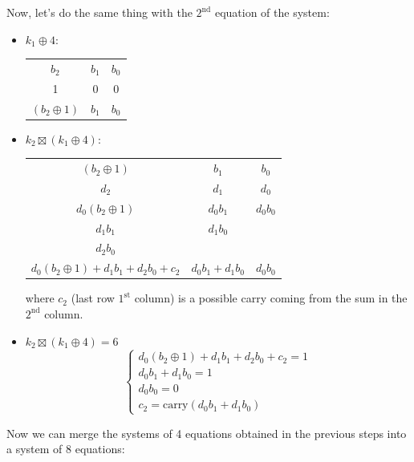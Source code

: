 \documentclass[11pt, a4paper]{article}
\begin{document}
\newpage
\hfill\break
Now, let's do the same thing with the $2^{\text{nd}}$ equation of the system:
\begin{itemize}
    \item $k_1\oplus4$:
    \begin{center}
        \begin{tabular}{ccc}
            $b_2$&$b_1$&$b_0$\\
            1&0&0\\
            \hline
            $(b_2\oplus1)$&$b_1$&$b_0$
        \end{tabular}
    \end{center}
    \item $k_2\boxtimes(k_1\oplus4)$:
    \begin{center}
        \begin{tabular}{c|c|c}
            $(b_2\oplus1)$&$b_1$&$b_0$\\
            $d_2$&$d_1$&$d_0$\\
            \hline
            $d_0(b_2\oplus1)$&$d_0b_1$&$d_0b_0$\\
            $d_1b_1$&$d_1b_0$&\\
            $d_2b_0$&&\\
            \hline
            $d_0(b_2\oplus1)+d_1b_1+d_2b_0+c_2$&$d_0b_1+d_1b_0$&$d_0b_0$
        \end{tabular}
    \end{center}
    where $c_2$ (last row $1^{\text{st}}$ column) is a possible carry coming from the sum in the $2^{\text{nd}}$ column.
    \item $k_2\boxtimes(k_1\oplus4)=6$
    \begin{equation*}
        \begin{cases}
            d_0(b_2\oplus1)+d_1b_1+d_2b_0+c_2=1\\
            d_0b_1+d_1b_0=1\\
            d_0b_0=0\\
            c_2=\text{carry}(d_0b_1+d_1b_0)
        \end{cases}
    \end{equation*}
\end{itemize}
Now we can merge the systems of 4 equations obtained in the previous steps into a system of 8 equations:
\end{document}
